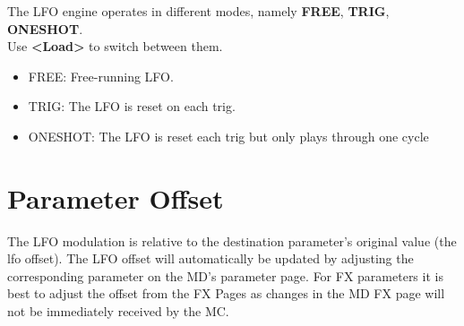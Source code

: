 The LFO engine operates in different modes, namely \textbf{FREE}, \textbf{TRIG}, \textbf{ONESHOT}.\\Use \textbf{<Load>} to switch between them.
\begin{itemize}
    \item FREE: Free-running LFO.
    \item TRIG: The LFO is reset on each trig.
    \item ONESHOT: The LFO is reset each trig but only plays through one cycle
\end{itemize}
\section{Parameter Offset}
The LFO modulation is relative to the destination parameter's original value (the lfo offset). The LFO offset will automatically be updated by adjusting the corresponding parameter on the MD's parameter page. For FX parameters it is best to adjust the offset from the FX Pages as changes in the MD FX page will not be immediately received by the MC.